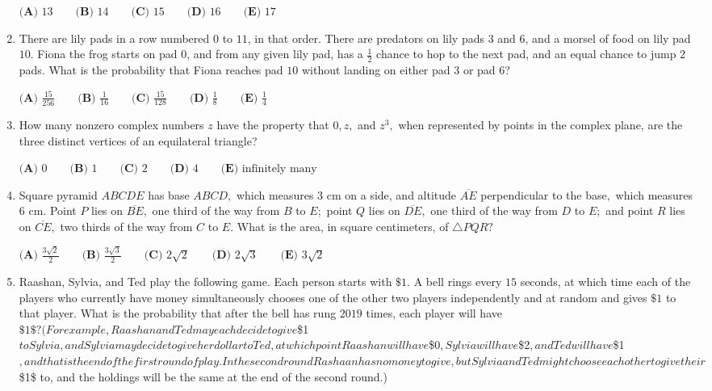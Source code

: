\documentclass{article}
\begin{document}
\begin{enumerate}[label=\arabic*., itemsep=0.5em]
$\textbf{(A) } 13 \qquad\textbf{(B) } 14 \qquad\textbf{(C) } 15 \qquad\textbf{(D) } 16\qquad\textbf{(E) } 17$\par \vspace{0.5em}\item There are lily pads in a row numbered $0$ to $11$, in that order. There are predators on lily pads $3$ and $6$, and a morsel of food on lily pad $10$. Fiona the frog starts on pad $0$, and from any given lily pad, has a $\frac{1}{2}$ chance to hop to the next pad, and an equal chance to jump $2$ pads. What is the probability that Fiona reaches pad $10$ without landing on either pad $3$ or pad $6$?

$\textbf{(A) } \frac{15}{256} \qquad \textbf{(B) } \frac{1}{16} \qquad \textbf{(C) } \frac{15}{128}\qquad \textbf{(D) } \frac{1}{8} \qquad \textbf{(E) } \frac14$\par \vspace{0.5em}\item How many nonzero complex numbers $z$ have the property that $0, z,$ and $z^3,$ when represented by points in the complex plane, are the three distinct vertices of an equilateral triangle?

$\textbf{(A) }0\qquad\textbf{(B) }1\qquad\textbf{(C) }2\qquad\textbf{(D) }4\qquad\textbf{(E) }\text{infinitely many}$\par \vspace{0.5em}\item Square pyramid $ABCDE$ has base $ABCD,$ which measures $3$ cm on a side, and altitude $\overline{AE}$ perpendicular to the base$,$ which measures $6$ cm. Point $P$ lies on $\overline{BE},$ one third of the way from $B$ to $E;$ point $Q$ lies on $\overline{DE},$ one third of the way from $D$ to $E;$ and point $R$ lies on $\overline{CE},$ two thirds of the way from $C$ to $E.$ What is the area, in square centimeters, of $\triangle PQR?$

$\textbf{(A) } \frac{3\sqrt2}{2} \qquad\textbf{(B) } \frac{3\sqrt3}{2} \qquad\textbf{(C) } 2\sqrt2 \qquad\textbf{(D) } 2\sqrt3 \qquad\textbf{(E) } 3\sqrt2$\par \vspace{0.5em}\item Raashan, Sylvia, and Ted play the following game. Each person starts with $\$1$. A bell rings every $15$ seconds, at which time each of the players who currently have money simultaneously chooses one of the other two players independently and at random and gives $\$1$ to that player. What is the probability that after the bell has rung $2019$ times, each player will have $\$1\$? 
(For example, Raashan and Ted may each decide to give $\$1$ to Sylvia, and Sylvia may decide to give her dollar to Ted, at which point Raashan will have $\$0$, Sylvia will have $\$2$, and Ted will have $\$1$, and that is the end of the first round of play. In the second round Rashaan has no money to give, but Sylvia and Ted might choose each other to give their $ \$1\$ to, and the holdings will be the same at the end of the second round.)


\end{enumerate}
\end{document}
